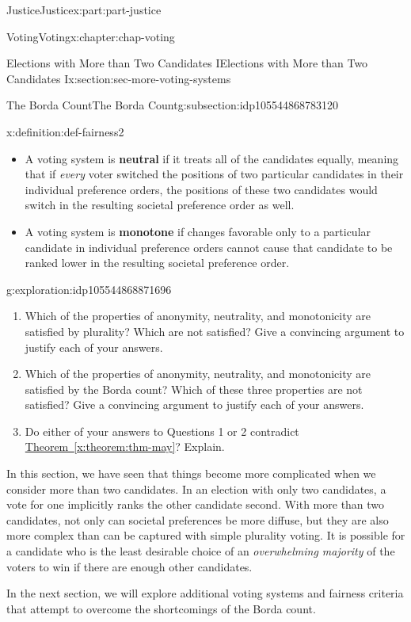 \documentclass[oneside,10pt,]{book}
\newcommand{\xreffont}{\relax}
\newcommand{\terminology}[1]{\textbf{#1}}
\numberwithin{equation}{section}
\begin{document}
\begin{partptx}{Justice}{}{Justice}{}{}{x:part:part-justice}
\begin{chapterptx}{Voting}{}{Voting}{}{}{x:chapter:chap-voting}
\begin{sectionptx}{Elections with More than Two Candidates I}{}{Elections with More than Two Candidates I}{}{}{x:section:sec-more-voting-systems}
\begin{subsectionptx}{The Borda Count}{}{The Borda Count}{}{}{g:subsection:idp105544868783120}
\begin{definition}{}{x:definition:def-fairness2}
\begin{itemize}[label=\textbullet]
\item{}A voting system is \terminology{neutral} if it treats all of the candidates equally, meaning that if \emph{every} voter switched the positions of two particular candidates in their individual preference orders, the positions of these two candidates would switch in the resulting societal preference order as well.%
\item{}A voting system is \terminology{monotone} if changes favorable only to a particular candidate in individual preference orders cannot cause that candidate to be ranked lower in the resulting societal preference order.%
\end{itemize}
\end{definition}
\begin{exploration}{}{g:exploration:idp105544868871696}%
%
\begin{enumerate}
\item{}Which of the properties of anonymity, neutrality, and monotonicity are satisfied by plurality? Which are not satisfied? Give a convincing argument to justify each of your answers.%
\item{}Which of the properties of anonymity, neutrality, and monotonicity are satisfied by the Borda count? Which of these three properties are not satisfied? Give a convincing argument to justify each of your answers.%
\item{}Do either of your answers to Questions 1 or 2 contradict \hyperref[x:theorem:thm-may]{Theorem~{\xreffont\ref{x:theorem:thm-may}}}? Explain.%
\end{enumerate}
\end{exploration}%
\begin{conclusion}{}%
In this section, we have seen that things become more complicated when we consider more than two candidates. In an election with only two candidates, a vote for one implicitly ranks the other candidate second. With more than two candidates, not only can societal preferences be more diffuse, but they are also more complex than can be captured with simple plurality voting. It is possible for a candidate who is the least desirable choice of an \emph{overwhelming majority} of the voters to win if there are enough other candidates.%
\par
In the next section, we will explore additional voting systems and fairness criteria that attempt to overcome the shortcomings of the Borda count.%
\end{conclusion}%
\end{subsectionptx}
\end{sectionptx}

\end{chapterptx}
\end{partptx}
\end{document}
